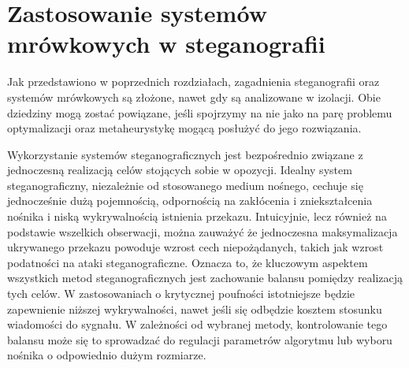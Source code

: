 \chapter{Zastosowanie systemów mrówkowych w steganografii}\label{chap:stegoants}
{

    Jak przedstawiono w poprzednich rozdziałach, zagadnienia steganografii oraz systemów mrówkowych są złożone, nawet
    gdy są analizowane w izolacji. Obie dziedziny mogą zostać powiązane, jeśli spojrzymy na nie jako na parę problemu
    optymalizacji oraz metaheurystykę mogącą posłużyć do jego rozwiązania.

    Wykorzystanie systemów steganograficznych jest bezpośrednio związane z jednoczesną realizacją celów stojących sobie
    w opozycji. Idealny system steganograficzny, niezależnie od stosowanego medium nośnego, cechuje się jednocześnie
    dużą pojemnością, odpornością na zakłócenia i zniekształcenia nośnika i niską wykrywalnością istnienia przekazu.
    Intuicyjnie, lecz również na podstawie wszelkich obserwacji, można zauważyć że jednoczesna maksymalizacja ukrywanego
    przekazu powoduje wzrost cech niepożądanych, takich jak wzrost podatności na ataki steganograficzne. Oznacza to, że
    kluczowym aspektem wszystkich metod steganograficznych jest zachowanie balansu pomiędzy realizacją tych celów. W
    zastosowaniach o krytycznej poufności istotniejsze będzie zapewnienie niższej wykrywalności, nawet jeśli się
    odbędzie kosztem stosunku wiadomości do sygnału. W zależności od wybranej metody, kontrolowanie tego balansu może
    się to sprowadzać do regulacji parametrów algorytmu lub wyboru nośnika o odpowiednio dużym rozmiarze.

}
